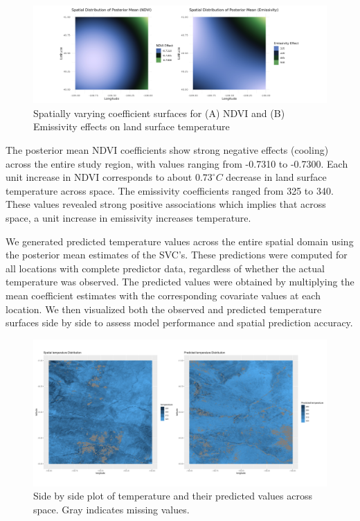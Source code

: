 \begin{figure}[H]
 \centering
 \includegraphics[width=\textwidth]{../../figures/model_means.png}
 \caption{Spatially varying coefficient surfaces for (A) NDVI and (B) Emissivity effects on land surface temperature}
 \label{fig:posterior means}
 \end{figure}
 The posterior mean NDVI coefficients show strong negative effects (cooling) across the entire study region, with values ranging from -0.7310 to -0.7300. 
 Each unit increase in NDVI corresponds to about $0.73^\circ C$ decrease in land surface temperature across space.
 The emissivity coefficients ranged from 325 to 340. These values revealed strong positive associations  which implies that across space, a unit increase in emissivity increases temperature.
 
 We generated predicted temperature values across the entire spatial domain using the posterior mean estimates of the SVC's. 
 These predictions were computed for all locations with complete predictor data, regardless of whether the actual temperature was observed. 
 The predicted values were obtained by multiplying the mean coefficient estimates with the corresponding covariate values at each location. 
 We then visualized both the observed and predicted temperature surfaces side by side to assess model performance and spatial prediction accuracy.
 
 
 \begin{figure}[H]
 \centering
 \includegraphics[width=\textwidth]{../../figures/predictions.png}
 \caption{Side by side plot of temperature and their predicted values across space. Gray indicates missing values.}
 \label{fig:predicted temperature}
 \end{figure}
 
